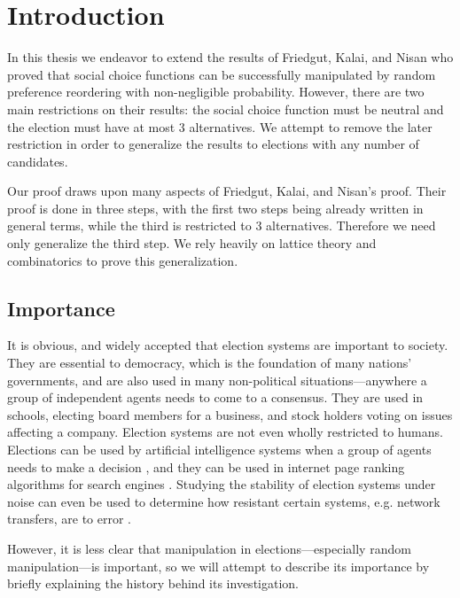

\chapter{Introduction}

	In this thesis we endeavor to extend the results of Friedgut, Kalai, and Nisan \cite{friedgut2008elections} who proved that social choice functions can be successfully manipulated by random preference reordering with non-negligible probability. However, there are two main restrictions on their results: the social choice function must be neutral and the election must have at most 3 alternatives. We attempt to remove the later restriction in order to generalize the results to elections with any number of candidates.

	Our proof draws upon many aspects of Friedgut, Kalai, and Nisan's proof. Their proof is done in three steps, with the first two steps being already written in general terms, while the third is restricted to 3 alternatives. Therefore we need only generalize the third step. We rely heavily on lattice theory and combinatorics to prove this generalization.


\section{Importance}

	It is obvious, and widely accepted that election systems are important to society. They are essential to democracy, which is the foundation of many nations' governments, and are also used in many non-political situations---anywhere a group of independent agents needs to come to a consensus. They are used in schools, electing board members for a business, and stock holders voting on issues affecting a company. Election systems are not even wholly restricted to humans. Elections can be used by artificial intelligence systems when a group of agents needs to make a decision \cite{ephrati1991clarke, ephrati1993multi, pennock2000social, dwork2001rank, fagin2003efficient}, and they can be used in internet page ranking algorithms for search engines \cite{chevaleyre2007short}. Studying the stability of election systems under noise can even be used to determine how resistant certain systems, e.g. network transfers, are to error \cite{shockey2008comparative}.

	However, it is less clear that manipulation in elections---especially random manipulation---is important, so we will attempt to describe its importance by briefly explaining the history behind its investigation.

